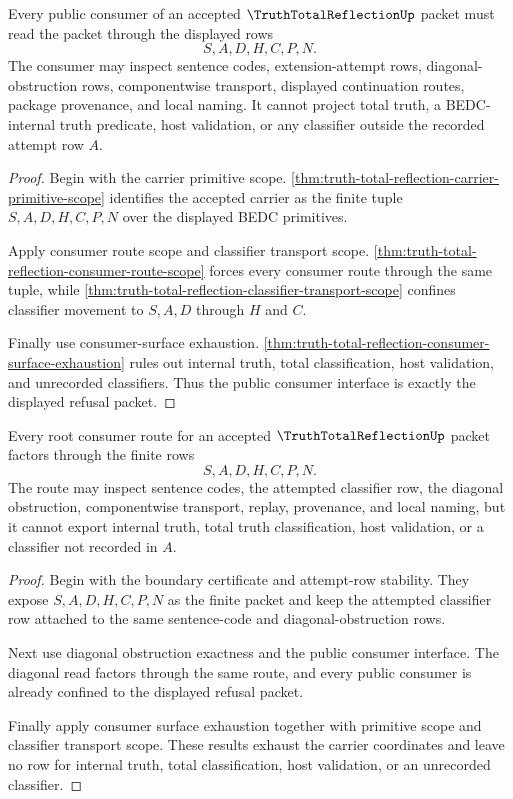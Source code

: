 \begin{theorem}
\label{thm:truth-total-reflection-public-consumer-interface}
Every public consumer of an accepted $\TruthTotalReflectionUp$ packet must read the packet through the displayed rows
$$
S,A,D,H,C,P,N.
$$
The consumer may inspect sentence codes, extension-attempt rows, diagonal-obstruction rows, componentwise transport, displayed continuation routes, package provenance, and local naming. It cannot project total truth, a BEDC-internal truth predicate, host validation, or any classifier outside the recorded attempt row $A$.
\end{theorem}
\begin{proof}
Begin with the carrier primitive scope. \autoref{thm:truth-total-reflection-carrier-primitive-scope} identifies the accepted carrier as the finite tuple $S,A,D,H,C,P,N$ over the displayed BEDC primitives.

Apply consumer route scope and classifier transport scope. \autoref{thm:truth-total-reflection-consumer-route-scope} forces every consumer route through the same tuple, while \autoref{thm:truth-total-reflection-classifier-transport-scope} confines classifier movement to $S,A,D$ through $H$ and $C$.

Finally use consumer-surface exhaustion. \autoref{thm:truth-total-reflection-consumer-surface-exhaustion} rules out internal truth, total classification, host validation, and unrecorded classifiers. Thus the public consumer interface is exactly the displayed refusal packet.
\end{proof}

\begin{theorem}
\label{thm:truth-total-reflection-root-route-totality}
Every root consumer route for an accepted $\TruthTotalReflectionUp$ packet
factors through the finite rows
$$
S,A,D,H,C,P,N.
$$
The route may inspect sentence codes, the attempted classifier row, the
diagonal obstruction, componentwise transport, replay, provenance, and local
naming, but it cannot export internal truth, total truth classification, host
validation, or a classifier not recorded in $A$.
\end{theorem}
\begin{proof}
Begin with the boundary certificate and attempt-row stability. They expose
$S,A,D,H,C,P,N$ as the finite packet and keep the attempted classifier row
attached to the same sentence-code and diagonal-obstruction rows.

Next use diagonal obstruction exactness and the public consumer interface. The
diagonal read factors through the same route, and every public consumer is
already confined to the displayed refusal packet.

Finally apply consumer surface exhaustion together with primitive scope and
classifier transport scope. These results exhaust the carrier coordinates and
leave no row for internal truth, total classification, host validation, or an
unrecorded classifier.
\end{proof}

